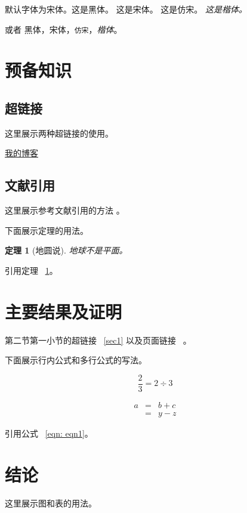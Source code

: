 \documentclass[a4paper, 12pt]{article}
\newtheorem{theorem}{\hspace{2em}定理}[section]
\begin{document}
默认字体为宋体。{\sffamily 这是黑体。} {\rmfamily 这是宋体。} {\ttfamily 这是仿宋。} {\it 这是楷体。}

或者 \textsf{黑体}，\textrm{宋体}，\texttt{仿宋}，\textit{楷体}。

\section{预备知识}

\subsection{超链接}
这里展示两种超链接的使用。

\label{sec1}

\href{https://blog.arpe1s.xyz/}{我的博客}

\subsection{文献引用}
这里展示参考文献引用的方法 \cite{LMZ1999}。

下面展示定理的用法。

\begin{theorem}[地圆说]
    \label{thm: thm1}
    地球不是平面。
\end{theorem}

引用定理 ~\ref{thm: thm1}。

\section{主要结果及证明}
第二节第一小节的超链接 ~\ref{sec1} 以及页面链接 ~\pageref{sec1}。

下面展示行内公式和多行公式的写法。

\[ \frac{2}{3} = 2 \div 3 \]

\begin{eqnarray}
    \label{eqn: eqn1}
    a & = & b + c \\
      & = & y - z
\end{eqnarray}

引用公式 ~\ref{eqn: eqn1}。

\section{结论}
这里展示图和表的用法。
\end{document}

